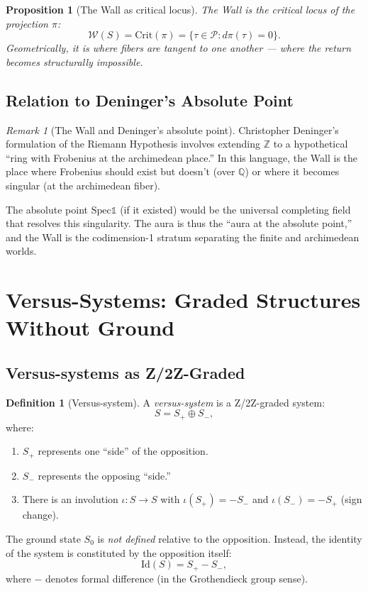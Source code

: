 \documentclass[12pt]{article}
\newtheorem{proposition}[theorem]{Proposition}
\theoremstyle{definition}
\newtheorem{definition}[theorem]{Definition}
\theoremstyle{remark}
\newtheorem{remark}[theorem]{Remark}
\newcommand{\Spec}{\mathrm{Spec}}
\begin{document}
\begin{proposition}[The Wall as critical locus]
The Wall is the critical locus of the projection $\pi$:
\[
\mathcal{W}(S) = \text{Crit}(\pi) = \{\tau \in \mathcal{P} : d\pi(\tau) = 0\}.
\]
Geometrically, it is where fibers are tangent to one another --- where the return becomes structurally impossible.
\end{proposition}

\subsection{Relation to Deninger's Absolute Point}

\begin{remark}[The Wall and Deninger's absolute point]
Christopher Deninger's formulation of the Riemann Hypothesis involves extending $\mathbb{Z}$ to a hypothetical ``ring with Frobenius at the archimedean place.'' In this language, the Wall is the place where Frobenius should exist but doesn't (over $\mathbb{Q}$) or where it becomes singular (at the archimedean fiber).

The absolute point $\Spec \mathbb{1}$ (if it existed) would be the universal completing field that resolves this singularity. The aura is thus the ``aura at the absolute point,'' and the Wall is the codimension-1 stratum separating the finite and archimedean worlds.
\end{remark}

\section{Versus-Systems: Graded Structures Without Ground}

\subsection{Versus-systems as Z/2Z-Graded}

\begin{definition}[Versus-system]
A \emph{versus-system} is a Z/2Z-graded system:
\[
S = S_+ \oplus S_-,
\]
where:
\begin{enumerate}
\item $S_+$ represents one ``side'' of the opposition.
\item $S_-$ represents the opposing ``side.''
\item There is an involution $\iota : S \to S$ with $\iota(S_+) = -S_-$ and $\iota(S_-) = -S_+$ (sign change).
\end{enumerate}

The ground state $S_0$ is \emph{not defined} relative to the opposition. Instead, the identity of the system is constituted by the opposition itself:
\[
\text{Id}(S) = S_+ - S_-,
\]
where $-$ denotes formal difference (in the Grothendieck group sense).
\end{definition}
\end{document}
